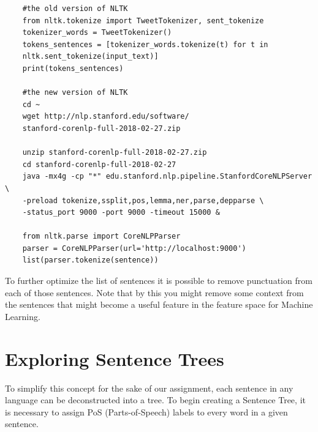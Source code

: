 \documentclass{article}
\begin{document}
\begin{verbatim}
    #the old version of NLTK
    from nltk.tokenize import TweetTokenizer, sent_tokenize
    tokenizer_words = TweetTokenizer()
    tokens_sentences = [tokenizer_words.tokenize(t) for t in 
    nltk.sent_tokenize(input_text)]
    print(tokens_sentences)
    
    #the new version of NLTK
    cd ~
    wget http://nlp.stanford.edu/software/
    stanford-corenlp-full-2018-02-27.zip
    
    unzip stanford-corenlp-full-2018-02-27.zip
    cd stanford-corenlp-full-2018-02-27
    java -mx4g -cp "*" edu.stanford.nlp.pipeline.StanfordCoreNLPServer \
    -preload tokenize,ssplit,pos,lemma,ner,parse,depparse \
    -status_port 9000 -port 9000 -timeout 15000 & 
    
    from nltk.parse import CoreNLPParser
    parser = CoreNLPParser(url='http://localhost:9000')
    list(parser.tokenize(sentence))
\end{verbatim}
To further optimize the list of sentences it is possible to remove punctuation from each of those sentences. Note that by this you might remove some context from the sentences that might become a useful feature in the feature space for Machine Learning.
\section{Exploring Sentence Trees}
To simplify this concept for the sake of our assignment, each sentence in any language can be deconstructed into a tree. To begin creating a Sentence Tree, it is necessary to assign PoS (Parts-of-Speech)\cite{POS} labels to every word in a given sentence.
\end{document}

